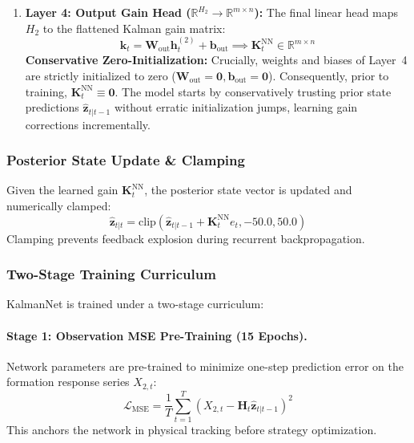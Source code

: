 \documentclass[11pt, a4paper]{article}
\begin{document}
\begin{enumerate}
    \item \textbf{Layer 4: Output Gain Head ($\mathbb{R}^{H_2} \to \mathbb{R}^{m \times n}$):}  
    The final linear head maps $H_2$ to the flattened Kalman gain matrix:
    \begin{equation}
        \mathbf{k}_t = \mathbf{W}_{\text{out}} \mathbf{h}_t^{(2)} + \mathbf{b}_{\text{out}} \implies \mathbf{K}_t^{\text{NN}} \in \mathbb{R}^{m \times n}
    \end{equation}
    \textbf{Conservative Zero-Initialization:} Crucially, weights and biases of Layer~4 are strictly initialized to zero ($\mathbf{W}_{\text{out}} = \mathbf{0}, \mathbf{b}_{\text{out}} = \mathbf{0}$). Consequently, prior to training, $\mathbf{K}_t^{\text{NN}} \equiv \mathbf{0}$. The model starts by conservatively trusting prior state predictions $\hat{\mathbf{z}}_{t|t-1}$ without erratic initialization jumps, learning gain corrections incrementally.
\end{enumerate}

\subsubsection{Posterior State Update \& Clamping}
Given the learned gain $\mathbf{K}_t^{\text{NN}}$, the posterior state vector is updated and numerically clamped:
\begin{equation}
    \hat{\mathbf{z}}_{t|t} = \text{clip}\left( \hat{\mathbf{z}}_{t|t-1} + \mathbf{K}_t^{\text{NN}} e_t, -50.0, 50.0 \right)
\end{equation}
Clamping prevents feedback explosion during recurrent backpropagation.

\subsubsection{Two-Stage Training Curriculum}
KalmanNet is trained under a two-stage curriculum:

\paragraph{Stage 1: Observation MSE Pre-Training (15 Epochs).}
Network parameters are pre-trained to minimize one-step prediction error on the formation response series $X_{2,t}$:
\begin{equation}
    \mathcal{L}_{\text{MSE}} = \frac{1}{T} \sum_{t=1}^T \left( X_{2,t} - \mathbf{H}_t \hat{\mathbf{z}}_{t|t-1} \right)^2
\end{equation}
This anchors the network in physical tracking before strategy optimization.
\end{document}
